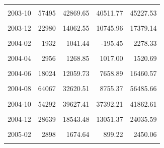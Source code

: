 \begin{longtable}[t]{crrrr}
\cellcolor{gray!10}{2003-09} & \cellcolor{gray!10}{97758} & \cellcolor{gray!10}{56966.27} & \cellcolor{gray!10}{47634.62} & \cellcolor{gray!10}{66297.92}\\
2003-10 & 57495 & 42869.65 & 40511.77 & 45227.53\\
\cellcolor{gray!10}{2003-11} & \cellcolor{gray!10}{35421} & \cellcolor{gray!10}{23479.04} & \cellcolor{gray!10}{16342.40} & \cellcolor{gray!10}{30615.68}\\
2003-12 & 22980 & 14062.55 & 10745.96 & 17379.14\\
\cellcolor{gray!10}{2004-01} & \cellcolor{gray!10}{3883} & \cellcolor{gray!10}{1715.58} & \cellcolor{gray!10}{741.00} & \cellcolor{gray!10}{2690.16}\\
2004-02 & 1932 & 1041.44 & -195.45 & 2278.33\\
\cellcolor{gray!10}{2004-03} & \cellcolor{gray!10}{2928} & \cellcolor{gray!10}{1822.56} & \cellcolor{gray!10}{1350.68} & \cellcolor{gray!10}{2294.44}\\
2004-04 & 2956 & 1268.85 & 1017.00 & 1520.69\\
\cellcolor{gray!10}{2004-05} & \cellcolor{gray!10}{6609} & \cellcolor{gray!10}{4190.79} & \cellcolor{gray!10}{3316.42} & \cellcolor{gray!10}{5065.16}\\
2004-06 & 18024 & 12059.73 & 7658.89 & 16460.57\\
\cellcolor{gray!10}{2004-07} & \cellcolor{gray!10}{30356} & \cellcolor{gray!10}{16920.65} & \cellcolor{gray!10}{12261.17} & \cellcolor{gray!10}{21580.13}\\
2004-08 & 64067 & 32620.51 & 8755.37 & 56485.66\\
\cellcolor{gray!10}{2004-09} & \cellcolor{gray!10}{121395} & \cellcolor{gray!10}{72113.43} & \cellcolor{gray!10}{54575.19} & \cellcolor{gray!10}{89651.67}\\
2004-10 & 54292 & 39627.41 & 37392.21 & 41862.61\\
\cellcolor{gray!10}{2004-11} & \cellcolor{gray!10}{45364} & \cellcolor{gray!10}{32136.43} & \cellcolor{gray!10}{19042.09} & \cellcolor{gray!10}{45230.77}\\
2004-12 & 28639 & 18543.48 & 13051.37 & 24035.59\\
\cellcolor{gray!10}{2005-01} & \cellcolor{gray!10}{7057} & \cellcolor{gray!10}{3900.05} & \cellcolor{gray!10}{2776.27} & \cellcolor{gray!10}{5023.83}\\
2005-02 & 2898 & 1674.64 & 899.22 & 2450.06\\
\cellcolor{gray!10}{2005-03} & \cellcolor{gray!10}{2528} & \cellcolor{gray!10}{1141.03} & \cellcolor{gray!10}{484.58} & \cellcolor{gray!10}{1797.48}\\

\end{longtable}
